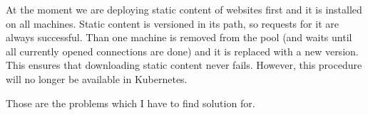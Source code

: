 At the moment we are deploying static content of websites first and it is installed on all machines. Static content is versioned in its path, so requests for it are always successful. Than one machine is removed from the pool (and waits until all currently opened connections are done) and it is replaced with a new version. This ensures that downloading static content never fails. However, this procedure will no longer be available in Kubernetes.

\begin{flushleft}
Those are the problems which I have to find solution for.
\end{flushleft} 
